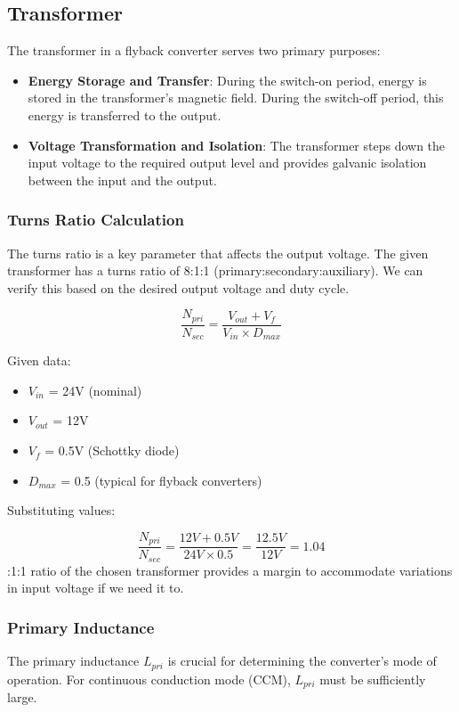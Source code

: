 \documentclass{article}
\begin{document}
\subsection{Transformer}
The transformer in a flyback converter serves two primary purposes:
\begin{itemize}
    \item \textbf{Energy Storage and Transfer}: During the switch-on period, energy is stored in the transformer's magnetic field. During the switch-off period, this energy is transferred to the output.
    \item \textbf{Voltage Transformation and Isolation}: The transformer steps down the input voltage to the required output level and provides galvanic isolation between the input and the output.
\end{itemize}

\subsubsection{Turns Ratio Calculation}
The turns ratio is a key parameter that affects the output voltage. The given transformer has a turns ratio of 8:1:1 (primary:secondary:auxiliary). We can verify this based on the desired output voltage and duty cycle.

\[
\frac{N_{pri}}{N_{sec}} = \frac{V_{out} + V_{f}}{V_{in} \times D_{max}}
\]

Given data:
\begin{itemize}
    \item $V_{in}$ = 24V (nominal)
    \item $V_{out}$ = 12V
    \item $V_{f}$ = 0.5V (Schottky diode)
    \item $D_{max}$ = 0.5 (typical for flyback converters)
\end{itemize}

Substituting values:

\[
\frac{N_{pri}}{N_{sec}} = \frac{12V + 0.5V}{24V \times 0.5} = \frac{12.5V}{12V} = 1.04
\]
:1:1 ratio of the chosen transformer provides a margin to accommodate variations in input voltage if we need it to.

\subsubsection{Primary Inductance}
The primary inductance $L_{pri}$ is crucial for determining the converter’s mode of operation. For continuous conduction mode (CCM), $L_{pri}$ must be sufficiently large.
\end{document}
